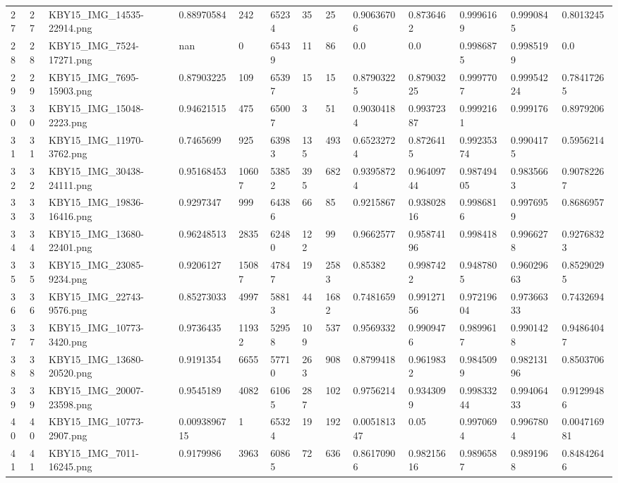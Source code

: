 \documentclass[11pt, a4paper, twoside]{report}
\begin{document}
\begin{longtable}[c]{@{}lllllllllllll@{}}
27 & 27 & KBY15\_IMG\_14535-22914.png & 0.88970584 & 242 & 65234 & 35 & 25 & 0.90636706 & 0.8736462 & 0.9996169 & 0.9990845 & 0.8013245 \\
28 & 28 & KBY15\_IMG\_7524-17271.png & nan & 0 & 65439 & 11 & 86 & 0.0 & 0.0 & 0.9986875 & 0.9985199 & 0.0 \\
29 & 29 & KBY15\_IMG\_7695-15903.png & 0.87903225 & 109 & 65397 & 15 & 15 & 0.87903225 & 0.87903225 & 0.9997707 & 0.99954224 & 0.78417265 \\
30 & 30 & KBY15\_IMG\_15048-2223.png & 0.94621515 & 475 & 65007 & 3 & 51 & 0.90304184 & 0.99372387 & 0.9992161 & 0.999176 & 0.8979206 \\
31 & 31 & KBY15\_IMG\_11970-3762.png & 0.7465699 & 925 & 63983 & 135 & 493 & 0.65232724 & 0.8726415 & 0.99235374 & 0.9904175 & 0.5956214 \\
32 & 32 & KBY15\_IMG\_30438-24111.png & 0.95168453 & 10607 & 53852 & 395 & 682 & 0.93958724 & 0.96409744 & 0.98749405 & 0.9835663 & 0.90782267 \\
33 & 33 & KBY15\_IMG\_19836-16416.png & 0.9297347 & 999 & 64386 & 66 & 85 & 0.9215867 & 0.93802816 & 0.9986816 & 0.9976959 & 0.8686957 \\
34 & 34 & KBY15\_IMG\_13680-22401.png & 0.96248513 & 2835 & 62480 & 122 & 99 & 0.9662577 & 0.95874196 & 0.998418 & 0.9966278 & 0.92768323 \\
35 & 35 & KBY15\_IMG\_23085-9234.png & 0.9206127 & 15087 & 47847 & 19 & 2583 & 0.85382 & 0.9987422 & 0.9487805 & 0.96029663 & 0.85290295 \\
36 & 36 & KBY15\_IMG\_22743-9576.png & 0.85273033 & 4997 & 58813 & 44 & 1682 & 0.7481659 & 0.99127156 & 0.97219604 & 0.97366333 & 0.7432694 \\
37 & 37 & KBY15\_IMG\_10773-3420.png & 0.9736435 & 11932 & 52958 & 109 & 537 & 0.9569332 & 0.9909476 & 0.9899617 & 0.9901428 & 0.94864047 \\
38 & 38 & KBY15\_IMG\_13680-20520.png & 0.9191354 & 6655 & 57710 & 263 & 908 & 0.8799418 & 0.9619832 & 0.9845099 & 0.98213196 & 0.8503706 \\
39 & 39 & KBY15\_IMG\_20007-23598.png & 0.9545189 & 4082 & 61065 & 287 & 102 & 0.9756214 & 0.9343099 & 0.99833244 & 0.99406433 & 0.91299486 \\
40 & 40 & KBY15\_IMG\_10773-2907.png & 0.0093896715 & 1 & 65324 & 19 & 192 & 0.005181347 & 0.05 & 0.9970694 & 0.9967804 & 0.004716981 \\
41 & 41 & KBY15\_IMG\_7011-16245.png & 0.9179986 & 3963 & 60865 & 72 & 636 & 0.86170906 & 0.98215616 & 0.9896587 & 0.9891968 & 0.84842646 \\

\end{longtable}
\end{document}
